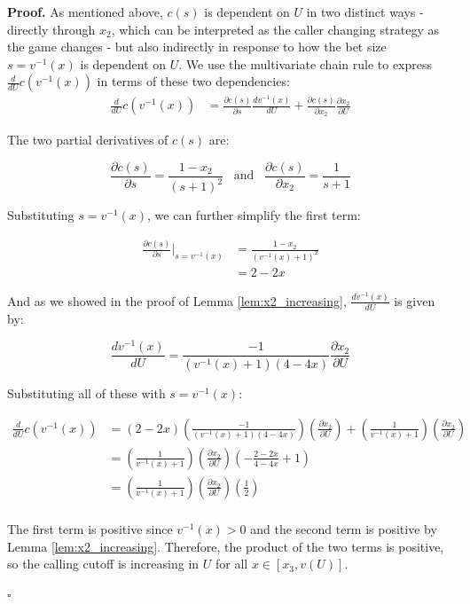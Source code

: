 \documentclass[a4paper,12pt]{article}
\theoremstyle{plain}
\theoremstyle{definition}
\newenvironment{customproof}[1][Proof]{\noindent\textbf{#1.} }{\hfill$\square$\vspace{1em}}
\begin{document}
\begin{customproof}
    As mentioned above, $c(s)$ is dependent on $U$ in two distinct ways -  directly through $x_2$, which can be interpreted as the caller changing strategy as the game changes - but also indirectly in response to how the bet size $s = v^{-1}(x)$ is dependent on $U$. We use the multivariate chain rule to express $\frac{d}{dU} c(v^{-1}(x))$ in terms of these two dependencies:
    \begin{align*}
        \frac{d}{dU} c(v^{-1}(x)) & = \frac{\partial c(s)}{\partial s} \frac{d v^{-1}(x)}{d U} + \frac{\partial c(s)}{\partial x_2} \frac{\partial x_2}{\partial U}
    \end{align*}
    
    The two partial derivatives of $c(s)$ are:

    $$ \frac{\partial c(s)}{\partial s} = \frac{1-x_2}{(s+1)^2} \; \; \; \text{and} \; \; \; \frac{\partial c(s)}{\partial x_2} = \frac{1}{s+1} $$

    Substituting $s = v^{-1}(x)$, we can further simplify the first term:

    \begin{align*}
        \frac{\partial c(s)}{\partial s} \bigg|_{s=v^{-1}(x)} & = \frac{1-x_2}{(v^{-1}(x)+1)^2} \\
        & = 2-2x
    \end{align*}

    And as we showed in the proof of Lemma \ref{lem:x2_increasing}, $\frac{d v^{-1}(x)}{d U}$ is given by:

    $$ \frac{d v^{-1}(x)}{d U} = \frac{-1}{(v^{-1}(x)+1)(4-4x)} \frac{\partial x_2}{\partial U} $$

    Substituting all of these with $s = v^{-1}(x)$:

    \begin{align*}
        \frac{d}{dU} c(v^{-1}(x)) & = 
        \left(2-2x\right) 
        \left(\frac{-1}{(v^{-1}(x)+1)(4-4x)}\right) 
        \left(\frac{\partial x_2}{\partial U}\right) 
        + \left(\frac{1}{v^{-1}(x)+1}\right) 
        \left(\frac{\partial x_2}{\partial U}\right)\\
        & = \left( \frac{1}{v^{-1}(x)+1} \right) 
        \left( \frac{\partial x_2}{\partial U} \right)
        \left( -\frac{2-2x}{4-4x} + 1\right) \\
        & = \left( \frac{1}{v^{-1}(x)+1} \right) 
        \left( \frac{\partial x_2}{\partial U} \right)
        \left( \frac{1}{2} \right) \\
    \end{align*}

    The first term is positive since $v^{-1}(x) > 0$ and the second term is positive by Lemma \ref{lem:x2_increasing}. Therefore, the product of the two terms is positive, so the calling cutoff is increasing in $U$ for all $x \in [x_3, v(U)]$.

\end{customproof}
\end{document}
